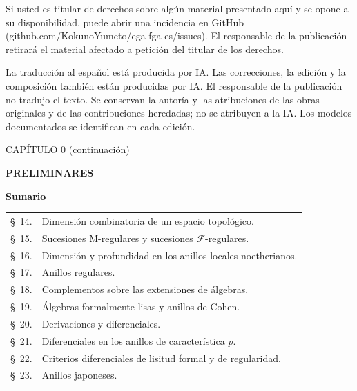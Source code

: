 \documentclass[10pt,oneside]{book}
\newcommand{\oldpage}[2][]{%
  \setcounter{footnote}{0}%
  \marginpar{\scriptsize\textbf{#1}~|~#2}\ignorespaces}
\begin{document}
Si usted es titular de derechos sobre algún material presentado aquí y se opone a su disponibilidad, puede abrir una incidencia en GitHub (github.com/KokunoYumeto/ega-fga-es/issues). El responsable de la publicación retirará el material afectado a petición del titular de los derechos.

La traducción al español está producida por IA. Las correcciones, la edición y la composición también están producidas por IA. El responsable de la publicación no tradujo el texto. Se conservan la autoría y las atribuciones de las obras originales y de las contribuciones heredadas; no se atribuyen a la IA. Los modelos documentados se identifican en cada edición.
\par
\endgroup
\clearpage

\clearpage
\thispagestyle{plain}
\oldpage[IV-1]{5}
\label{chapter:0IV1-es}

\begin{center}
{\large CAPÍTULO 0 (continuación)\footnotemark\par}
\vspace{1.5em}
{\Large\bfseries PRELIMINARES\par}
\vspace{2em}
{\large\bfseries Sumario\par}
\end{center}


\begin{center}
\begin{tabular}{@{}r l@{}}
\S~14. & Dimensión combinatoria de un espacio topológico.\\
\S~15. & Sucesiones M-regulares y sucesiones $\mathscr F$-regulares.\\
\S~16. & Dimensión y profundidad en los anillos locales noetherianos.\\
\S~17. & Anillos regulares.\\
\S~18. & Complementos sobre las extensiones de álgebras.\\
\S~19. & Álgebras formalmente lisas y anillos de Cohen.\\
\S~20. & Derivaciones y diferenciales.\\
\S~21. & Diferenciales en los anillos de característica $p$.\\
\S~22. & Criterios diferenciales de lisitud formal y de regularidad.\\
\S~23. & Anillos japoneses.
\end{tabular}
\end{center}
\end{document}
